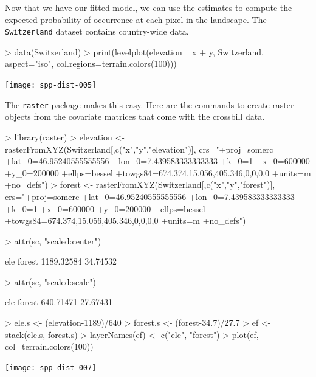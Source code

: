 \documentclass[a4paper]{article}
\renewenvironment{Schunk}{\vspace{\topsep}}{\vspace{\topsep}}
\begin{document}
Now that we have our fitted model, we can use the estimates to compute
the expected probability of occurrence at each pixel in the
landscape. The \verb+Switzerland+ dataset contains country-wide data.

\begin{Schunk}
\begin{Sinput}
> data(Switzerland)
> print(levelplot(elevation ~ x + y, Switzerland, aspect="iso",
                 col.regions=terrain.colors(100)))
\end{Sinput}
\end{Schunk}
\texttt{[image: spp-dist-005]}

The \texttt{raster} package \citep{hijmans_vanEtten:2012}
makes this easy. Here are the
commands to create raster objects from the covariate matrices that
come with the crossbill data.

\begin{Schunk}
\begin{Sinput}
> library(raster)
> elevation <- rasterFromXYZ(Switzerland[,c("x","y","elevation")],
     crs="+proj=somerc +lat_0=46.95240555555556 +lon_0=7.439583333333333 +k_0=1 +x_0=600000 +y_0=200000 +ellps=bessel +towgs84=674.374,15.056,405.346,0,0,0,0 +units=m +no_defs")
> forest <- rasterFromXYZ(Switzerland[,c("x","y","forest")],
     crs="+proj=somerc +lat_0=46.95240555555556 +lon_0=7.439583333333333 +k_0=1 +x_0=600000 +y_0=200000 +ellps=bessel +towgs84=674.374,15.056,405.346,0,0,0,0 +units=m +no_defs")
\end{Sinput}
\end{Schunk}


\begin{Schunk}
\begin{Sinput}
> attr(sc, "scaled:center")
\end{Sinput}
\begin{Soutput}
       ele     forest 
1189.32584   34.74532 
\end{Soutput}
\begin{Sinput}
> attr(sc, "scaled:scale")
\end{Sinput}
\begin{Soutput}
      ele    forest 
640.71471  27.67431 
\end{Soutput}
\begin{Sinput}
> ele.s <- (elevation-1189)/640
> forest.s <- (forest-34.7)/27.7
> ef <- stack(ele.s, forest.s)
> layerNames(ef) <- c("ele", "forest")
> plot(ef, col=terrain.colors(100))
\end{Sinput}
\end{Schunk}
\texttt{[image: spp-dist-007]}
\end{document}
